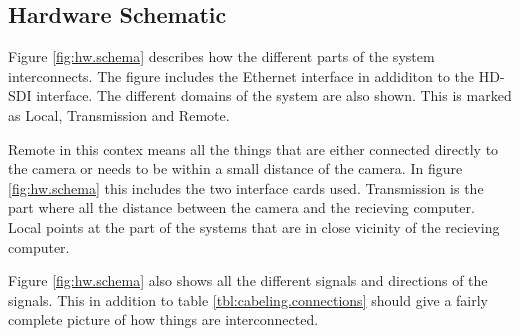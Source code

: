 \subsection{Hardware Schematic}
Figure \vref{fig:hw.schema} describes how the different parts of the system interconnects. The figure includes the Ethernet interface in addiditon to the 
HD-SDI interface. The different domains of the system are also shown. This is marked as Local, Transmission and Remote.

Remote in this contex means all the things that are either connected directly to the camera or needs to be within a small distance of the camera. In figure \ref{fig:hw.schema} 
this includes the two interface cards used. Transmission is the part where all the distance between the camera and the recieving computer. Local points at the part 
of the systems that are in close vicinity of the recieving computer. 

Figure \ref{fig:hw.schema} also shows all the different signals and directions of the signals. This in addition to table \vref{tbl:cabeling.connections} should 
give a fairly complete picture of how things are interconnected.

